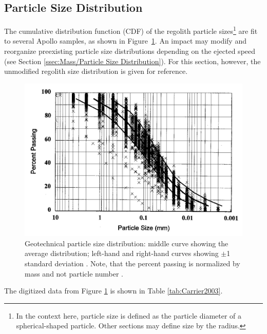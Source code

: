 \documentclass{article}
\begin{document}
\subsection{Particle Size Distribution}

The cumulative distribution function (CDF) of the regolith particle sizes\footnote{In the context here, particle size is defined as the particle diameter of a spherical-shaped particle. Other sections may define size by the radius.} are fit to several Apollo samples, as shown in Figure~\ref{fig:Carrier2003_Fig1_particle-size-distribution}. An impact may modify and reorganize preexisting particle size distributions depending on the ejected speed (see Section \ref{ssec:Mass/Particle Size Distribution}). For this section, however, the unmodified regolith size distribution is given for reference.
\begin{figure}[h!]
	\centering
	\includegraphics[scale=0.4]{Carrier2003_Fig1_particle-size-distribution.PNG}
	\caption{Geotechnical particle size distribution: middle curve showing the average distribution; left-hand and right-hand curves showing $\pm$1 standard deviation \citep{carrier2003particle}. Note, that the percent passing is normalized by mass and not particle number \citep[see][]{carrier1973lunar}.}\label{fig:Carrier2003_Fig1_particle-size-distribution}
\end{figure}
The digitized data from Figure \ref{fig:Carrier2003_Fig1_particle-size-distribution} is shown in Table \ref{tab:Carrier2003}.
\begin{table}
	\centering
	\caption{Digitized data points from Figure \ref{fig:Carrier2003_Fig1_particle-size-distribution}, see \cite{carrier2003particle}.}\label{tab:Carrier2003}
\end{table}
\end{document}
